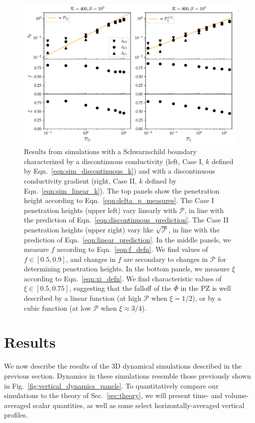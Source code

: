 \documentclass[twocolumn]{aastex631}
\newcommand{\mP}{\ensuremath{\mathcal{P}}}
\renewcommand{\bar}[1]{\overline{#1}}
\begin{document}
\begin{figure}[t]
\centering
\includegraphics[width=\textwidth]{parameters_vs_p.pdf}
\caption{
Results from simulations with a Schwarzschild boundary characterized by a discontinuous conductivity (left, Case I, $k$ defined by Eqn.~\ref{eqn:sim_discontinuous_k}) and with a discontinuous conductivity gradient (right, Case II, $k$ defined by Eqn.~\ref{eqn:sim_linear_k}).
The top panels show the penetration height according to Eqn.~\ref{eqn:delta_p_measures}.
The Case I penetration heights (upper left) vary linearly with $\mP$, in line with the prediction of Eqn.~\ref{eqn:discontinuous_prediction}.
The Case II penetration heights (upper right) vary like $\sqrt{\mP}$, in line with the prediction of Eqn.~\ref{eqn:linear_prediction}.
In the middle panels, we measure $f$ according to Eqn.~\ref{eqn:f_defn}.
We find values of $f \in [0.5, 0.9]$, and changes in $f$ are secondary to changes in $\mP$ for determining penetration heights.
In the bottom panels, we measure $\xi$ according to Eqn.~\ref{eqn:xi_defn}.
We find characteristic values of $\xi \in [0.5, 0.75]$, suggesting that the falloff of the $\bar{\Phi}$ in the PZ is well described by a linear function (at high $\mP$ when $\xi = 1/2$), or by a cubic function (at low $\mP$ when $\xi \approx 3/4$).
\label{fig:parameters_vs_p}
}
\end{figure}





\section{Results}
\label{sec:results}

We now describe the results of the 3D dynamical simulations described in the previous section.
Dynamics in these simulations resemble those previously shown in Fig.~\ref{fig:vertical_dynamics_panels}.
To quantitatively compare our simulations to the theory of Sec.~\ref{sec:theory}, we will present time- and volume-averaged scalar quantities, as well as some select horizontally-averaged vertical profiles.
\end{document}
